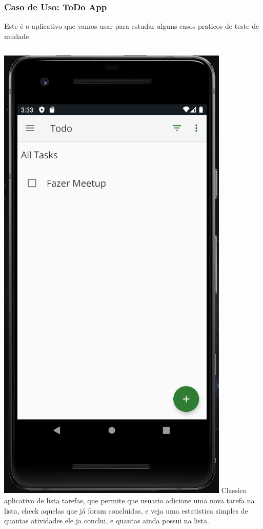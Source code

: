 \documentclass{beamer}
\begin{document}
\begin{frame}
	\frametitle{Caso de Uso: ToDo App}
	Este é o aplicativo que vamos usar para estudar alguns casos praticos de teste de unidade
	\begin{columns}[c]
		
		\includegraphics[scale=0.3]{toDoAppSample}
		Classico aplicativo de lista tarefas, que permite que usuario adicione uma nova tarefa na lista, check aquelas que já foram concluidas, e veja uma estatistica simples de quantas atividades ele ja conclui, e quantas ainda possui na lista.
		
	\end{columns}
	
\end{frame}
\end{document}
